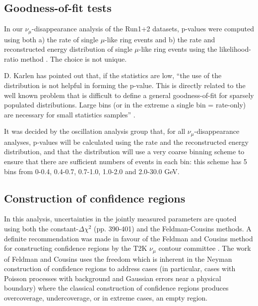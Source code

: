 
\subsection {Goodness-of-fit tests}
\label{sec:gof_test}

In our $\nu_{\mu}$-disappearance analysis of the Run1+2 datasets, p-values were computed using both 
a) the rate of single $\mu$-like ring events and 
b) the rate and reconstructed energy distribution of single $\mu$-like ring events using the likelihood-ratio method \cite{NickPvalue}.
The choice is not unique.

D. Karlen has pointed out that, if the statistics are low, ``the use of the
distribution is not helpful in forming the p-value. 
This is directly related to the well known problem that is difficult to define
a general goodness-of-fit for sparsely populated distributions.
Large bins (or in the extreme a single bin = rate-only)
are necessary for small statistics samples'' \cite{KarlenPvalue}.

It was decided by the oscillation analysis group that, for all $\nu_{\mu}$-disappearance analyses, 
p-values will be calculated using the rate and the reconstructed energy distribution,
and that the distribution will use a very coarse binning
scheme to ensure that there are sufficient numbers of events in each bin: 
this scheme has 5 bins from 0-0.4, 0.4-0.7, 0.7-1.0, 1.0-2.0 and 2.0-30.0 GeV.

\subsection {Construction of confidence regions}
\label{sec:contour_construction}

In this analysis, uncertainties in the jointly measured parameters are quoted using both 
the constant-$\Delta\chi^{2}$ \cite{PDG2012} (pp. 390-401)
and the Feldman-Cousins \cite{FeldmanCousins} methods.
A definite recommendation was made in favour of the Feldman and Cousins method 
for constructing confidence regions by the T2K $\nu_{\mu}$ contour committee \cite{T2KNuMuContourCom}.
The work of Feldman and Cousins 
uses the freedom which is inherent in the Neyman construction of confidence regions
to address cases 
(in particular, cases with
Poisson processes with background and Gaussian errors near a physical boundary)
where the classical construction of confidence regions produces overcoverage, undercoverage, or
in extreme cases, an empty region.

